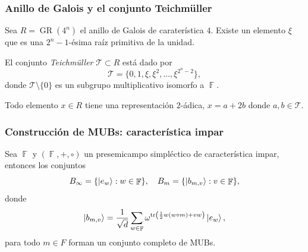 \documentclass[10pt,spanish]{beamer}
\DeclareMathOperator{\F}{\mathbb{F}}
\DeclareMathOperator{\tr}{tr}
\DeclareMathOperator{\GR}{GR}
\begin{document}
  \begin{frame}
    \frametitle{Anillo de Galois y el conjunto Teichmüller}

    Sea $R = \GR(4^{n})$ el anillo de Galois de
    caraterística $4$. Existe un elemento $\xi$ que es
    una $2^{n}-1$-ésima raíz primitiva de la unidad.

    \vspace{5pt}

    \begin{definition}
      El conjunto \textit{Teichmüller} $\mathcal T \subset
      R$ está dado por
      \begin{equation}
        \mathcal T
        = \{0,1,\xi,\xi^2,\ldots,\xi^{2^{n}-2}\},
      \end{equation}
      donde $\mathcal T \setminus \{0\}$ es un subgrupo
      multiplicativo isomorfo a $\F$.
    \end{definition}

    \vspace{5pt}

    Todo elemento $x \in R$ tiene una representación
    $2$-ádica, $x = a + 2b$ donde $a,b \in \mathcal T$.
  \end{frame}

  \begin{frame}
    \frametitle{Construcción de MUBs: característica impar}

    \begin{theorem}
      Sea $\F$  y $(\F,+,\circ)$ un presemicampo simpléctico
      de característica impar, entonces los conjuntos
      \begin{equation}
        B_\infty
        = \{\ket{e_w} : w \in \F\},
        \quad
        B_m
        = \{\ket{b_{m,v}} : v \in \F\},
      \end{equation}
      donde
      \begin{equation}
        \ket{b_{m,v}}
        = \frac{1}{\sqrt{d}} 
        \sum_{w \in \F}^{} \omega^{\tr\left(\frac{1}{2} w
        (w\circ m) + vw\right)} \ket{e_w},
      \end{equation}
      para todo $m \in F$ forman un conjunto completo de
      MUBs.
    \end{theorem}
  \end{frame}
\end{document}
